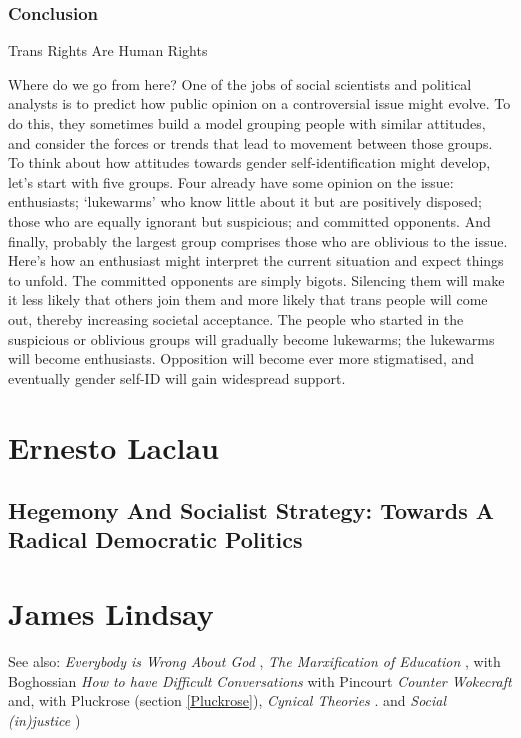 \documentclass[10pt,titlepage]{book}
\begin{document}
\subsubsection{Conclusion}

Trans Rights Are Human Rights

Where do we go from here? One of the jobs of social scientists and political analysts is to predict how public opinion on a controversial issue might evolve. To do this, they sometimes build a model grouping people with similar attitudes, and consider the forces or trends that lead to movement between those groups. To think about how attitudes towards gender self-identification might develop, let’s start with five groups. Four already have some opinion on the issue: enthusiasts; ‘lukewarms’ who know little about it but are positively disposed; those who are equally ignorant but suspicious; and committed opponents. And finally, probably the largest group comprises those who are oblivious to the issue. Here’s how an enthusiast might interpret the current situation and expect things to unfold. The committed opponents are simply bigots. Silencing them will make it less likely that others join them and more likely that trans people will come out, thereby increasing societal acceptance. The people who started in the suspicious or oblivious groups will gradually become lukewarms; the lukewarms will become enthusiasts. Opposition will become ever more stigmatised, and eventually gender self-ID will gain widespread support.


\section{Ernesto Laclau}

\subsection{Hegemony And Socialist Strategy: Towards A Radical Democratic Politics \cite{laclau-hegsoc}}

\section{James Lindsay}

See also: \emph{Everybody is Wrong About God} \cite{lindsay-everybody},
\emph{The Marxification of Education} \cite{lindsay-marxedu},
with Boghossian \emph{How to have Difficult Conversations} \cite{boghossian-conversations}
with Pincourt \emph{Counter Wokecraft} \cite{pincourt-cw}
and, with Pluckrose (section \ref{Pluckrose}),
\emph{Cynical Theories} \cite{pluckrose-cynical}.
and \emph{Social (in)justice} \cite{pluckrose-socinj})
\end{document}
